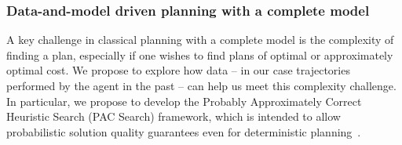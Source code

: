 \documentclass[12pt]{article}
\begin{document}
\subsubsection{Data-and-model driven planning with a complete model}

A key challenge in classical planning with a complete model is the complexity of finding a plan, especially if one wishes to find plans of optimal or approximately optimal cost. We propose to explore how data -- in our case trajectories performed by the agent in the past -- can help us meet this complexity challenge. %
In particular, we propose to develop the Probably Approximately Correct Heuristic Search (PAC Search) framework, which is intended to allow probabilistic solution quality guarantees even for deterministic planning~\cite{stern2011probably,stern2012search}. %
\end{document}
